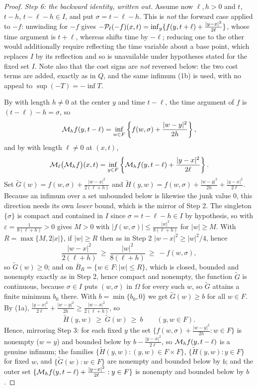 \begin{proof}
\emph{Step 6: the backward identity, written out.}
Assume now $\ell,h>0$ and $t$, $t-h$, $t-\ell-h\in I$, and put
$\sigma=t-\ell-h$. This is \emph{not} the forward case applied to $-f$:
unwinding  for $-f$ gives
$-\mathcal{P}_\ell(-f)(x,t)=\inf_{y}\{f(y,t+\ell)+\frac{|y-x|^2}{2\ell}\}$, whose
time argument is $t+\ell$, whereas  shifts time by $-\ell$;
reducing one to the other would additionally require reflecting the time
variable about a base point, which replaces $I$ by its reflection and so is
unavailable under hypotheses stated for the fixed set $I$. Note also that the
cost signs are \emph{not} reversed below: the two cost terms are added, exactly
as in $Q$, and the same infimum (1b) is used, with no appeal to
$\sup(-T)=-\inf T$.

By  with length $h\ne0$ at the center $y$ and time
$t-\ell$, the time argument of $f$ is $(t-\ell)-h=\sigma$, so
\[
  \mathcal{M}_hf(y,t-\ell)
   =\inf_{w\in F}\left\{f(w,\sigma)+\frac{|w-y|^2}{2h}\right\},
\]
and by  with length $\ell\ne0$ at $(x,t)$,
\[
  \mathcal{M}_\ell\bigl(\mathcal{M}_hf\bigr)(x,t)
   =\inf_{y\in F}\left\{\mathcal{M}_hf(y,t-\ell)+\frac{|y-x|^2}{2\ell}\right\}.
\]
Set $\widetilde G(w)=f(w,\sigma)+\frac{|w-x|^2}{2(\ell+h)}$ and
$\widetilde H(y,w)=f(w,\sigma)+\frac{|w-y|^2}{2h}+\frac{|y-x|^2}{2\ell}$.
Because an infimum over a set unbounded below is likewise the junk value $0$,
this direction needs its own \emph{lower} bound, which is the mirror of Step 2.
The singleton $\{\sigma\}$ is compact and contained in $I$ since
$\sigma=t-\ell-h\in I$ by hypothesis, so  with
$\varepsilon=\frac1{8(\ell+h)}>0$ gives $M>0$ with
$|f(w,\sigma)|\le\frac{|w|^2}{8(\ell+h)}$ for $|w|\ge M$. With
$R=\max\{M,2|x|\}$, if $|w|\ge R$ then as in Step 2
$|w-x|^2\ge|w|^2/4$, hence
\[
  \frac{|w-x|^2}{2(\ell+h)}\ \ge\ \frac{|w|^2}{8(\ell+h)}\ \ge\ -f(w,\sigma),
\]
so $\widetilde G(w)\ge0$; and on $\overline B_R=\{w\in F:|w|\le R\}$, which is
closed, bounded and nonempty exactly as in Step 2, hence compact and nonempty,
the function $\widetilde G$ is continuous, because $\sigma\in I$ puts
$(w,\sigma)$ in $\Omega$ for every such $w$, so $\widetilde G$ attains a finite
minimum $b_0$ there. With
$b=\min\{b_0,0\}$ we get $\widetilde G(w)\ge b$ for all $w\in F$. By (1a),
$\frac{|y-x|^2}{2\ell}+\frac{|w-y|^2}{2h}\ge\frac{|w-x|^2}{2(\ell+h)}$, so
\[
  \widetilde H(y,w)\ \ge\ \widetilde G(w)\ \ge\ b\qquad(y,w\in F).
\]
Hence, mirroring Step 3: for each fixed $y$ the set
$\{f(w,\sigma)+\frac{|w-y|^2}{2h}:w\in F\}$ is nonempty ($w=y$) and bounded
below by $b-\frac{|y-x|^2}{2\ell}$, so $\mathcal{M}_hf(y,t-\ell)$ is a genuine
infimum; the families $\{\widetilde H(y,w):(y,w)\in F\times F\}$,
$\{\widetilde H(y,w):y\in F\}$ for fixed $w$, and
$\{\widetilde G(w):w\in F\}$ are nonempty and bounded below by $b$; and the
outer set $\{\mathcal{M}_hf(y,t-\ell)+\frac{|y-x|^2}{2\ell}:y\in F\}$ is nonempty
and bounded below by $b$.


\end{proof}
